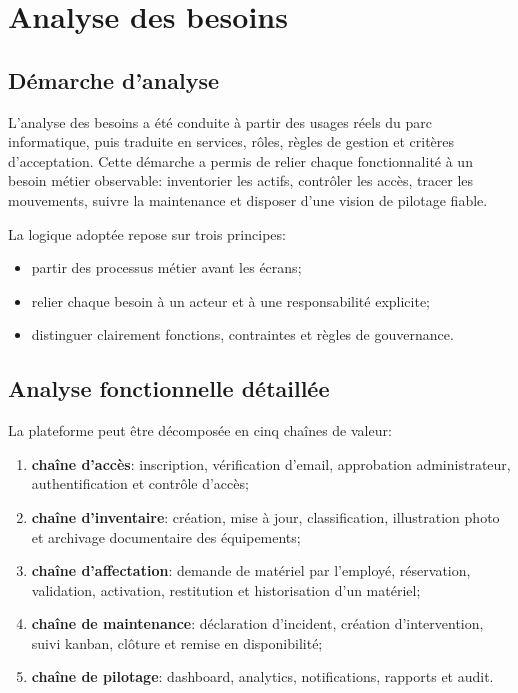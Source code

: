 ﻿\chapter{Analyse des besoins}
\label{chap:analyse}

\section{Démarche d'analyse}
L'analyse des besoins a été conduite à partir des usages réels du parc informatique, puis traduite en services, rôles, règles de gestion et critères d'acceptation. Cette démarche a permis de relier chaque fonctionnalité à un besoin métier observable: inventorier les actifs, contrôler les accès, tracer les mouvements, suivre la maintenance et disposer d'une vision de pilotage fiable.

La logique adoptée repose sur trois principes:
\begin{itemize}
  \item partir des processus métier avant les écrans;
  \item relier chaque besoin à un acteur et à une responsabilité explicite;
  \item distinguer clairement fonctions, contraintes et règles de gouvernance.
\end{itemize}

\section{Analyse fonctionnelle détaillée}
La plateforme peut être décomposée en cinq chaînes de valeur:
\begin{enumerate}
  \item \textbf{chaîne d'accès}: inscription, vérification d'email, approbation administrateur, authentification et contrôle d'accès;
  \item \textbf{chaîne d'inventaire}: création, mise à jour, classification, illustration photo et archivage documentaire des équipements;
  \item \textbf{chaîne d'affectation}: demande de matériel par l'employé, réservation, validation, activation, restitution et historisation d'un matériel;
  \item \textbf{chaîne de maintenance}: déclaration d'incident, création d'intervention, suivi kanban, clôture et remise en disponibilité;
  \item \textbf{chaîne de pilotage}: dashboard, analytics, notifications, rapports et audit.
\end{enumerate}

